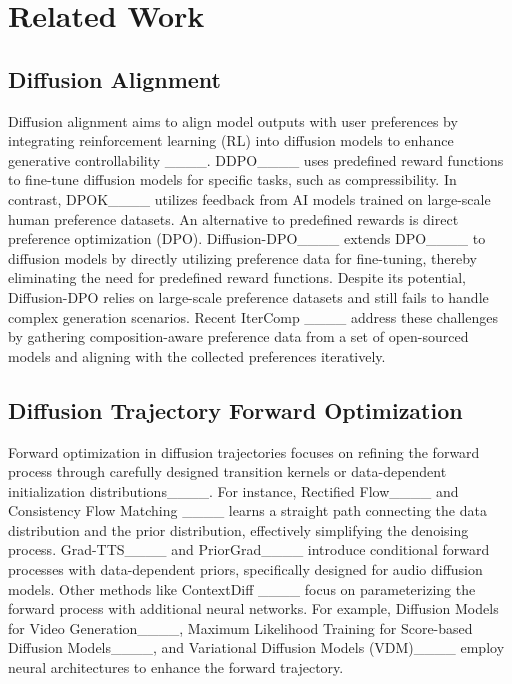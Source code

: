 \section{Related Work}
\subsection{Diffusion Alignment}
Diffusion alignment aims to align model outputs with user preferences by integrating reinforcement learning (RL) into diffusion models to enhance generative controllability ____. DDPO____ uses predefined reward functions to fine-tune diffusion models for specific tasks, such as compressibility. In contrast, DPOK____ utilizes feedback from AI models trained on large-scale human preference datasets. 
An alternative to predefined rewards is direct preference optimization (DPO). 
Diffusion-DPO____ extends DPO____ to diffusion models by directly utilizing preference data for fine-tuning, thereby eliminating the need for predefined reward functions. Despite its potential, Diffusion-DPO relies on large-scale preference datasets and still fails to handle complex generation scenarios.
Recent IterComp ____ address these challenges by gathering composition-aware preference data from a set of open-sourced models and aligning with the collected preferences iteratively.

\subsection{Diffusion Trajectory Forward Optimization}
Forward optimization in diffusion trajectories focuses on refining the forward process through carefully designed transition kernels or data-dependent initialization distributions____. For instance, Rectified Flow____ and Consistency Flow Matching ____ learns a straight path connecting the data distribution and the prior distribution, effectively simplifying the denoising process. Grad-TTS____ and PriorGrad____ introduce conditional forward processes with data-dependent priors, specifically designed for audio diffusion models. Other methods like ContextDiff ____ focus on parameterizing the forward process with additional neural networks. For example, Diffusion Models for Video Generation____, Maximum Likelihood Training for Score-based Diffusion Models____, and Variational Diffusion Models (VDM)____ employ neural architectures to enhance the forward trajectory. 


